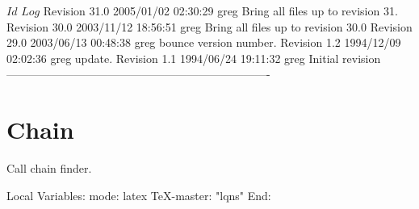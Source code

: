 \C 
\C $Id$
\C 
\C $Log$
\C Revision 31.0  2005/01/02 02:30:29  greg
\C Bring all files up to revision 31.
\C
\C Revision 30.0  2003/11/12 18:56:51  greg
\C Bring all files up to revision 30.0
\C
\C Revision 29.0  2003/06/13 00:48:38  greg
\C bounce version number.
\C
\C Revision 1.2  1994/12/09 02:02:36  greg
\C update.
\C
%
\C Revision 1.1  1994/06/24  19:11:32  greg
\C Initial revision
\C
\C
\C ----------------------------------------------------------------------
\section{Chain}

Call chain finder.

\label{sec:chain-findInterlock}

\C Local Variables: 
\C mode: latex
\C TeX-master: "lqns"
\C End: 
